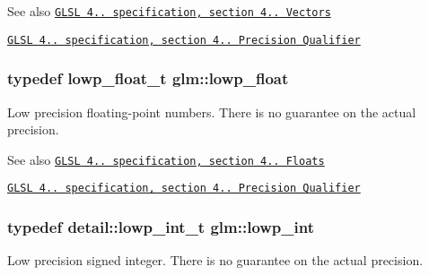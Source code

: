 \begin{DoxySeeAlso}{\-See also}
\href{http://www.opengl.org/registry/doc/GLSLangSpec.4.20.8.pdf}{\tt \-G\-L\-S\-L 4.. specification, section 4.. \-Vectors} 

\href{http://www.opengl.org/registry/doc/GLSLangSpec.4.20.8.pdf}{\tt \-G\-L\-S\-L 4.. specification, section 4.. \-Precision \-Qualifier} 
\end{DoxySeeAlso}
\hypertarget{group__core__precision_ga2887fbc729ac5c1c5caeb7cd57a7145c}{
\subsubsection[{lowp\-\_\-float}]{\setlength{\rightskip}{0pt plus 5cm}typedef lowp\-\_\-float\-\_\-t {\bf glm\-::lowp\-\_\-float}}}\label{group__core__precision_ga2887fbc729ac5c1c5caeb7cd57a7145c}
\-Low precision floating-\/point numbers. \-There is no guarantee on the actual precision.

\begin{DoxySeeAlso}{\-See also}
\href{http://www.opengl.org/registry/doc/GLSLangSpec.4.20.8.pdf}{\tt \-G\-L\-S\-L 4.. specification, section 4.. \-Floats} 

\href{http://www.opengl.org/registry/doc/GLSLangSpec.4.20.8.pdf}{\tt \-G\-L\-S\-L 4.. specification, section 4.. \-Precision \-Qualifier} 
\end{DoxySeeAlso}
\hypertarget{group__core__precision_ga4681244bf4a184734f03aa9df4e3d288}{
\subsubsection[{lowp\-\_\-int}]{\setlength{\rightskip}{0pt plus 5cm}typedef detail\-::lowp\-\_\-int\-\_\-t {\bf glm\-::lowp\-\_\-int}}}\label{group__core__precision_ga4681244bf4a184734f03aa9df4e3d288}
\-Low precision signed integer. \-There is no guarantee on the actual precision.

